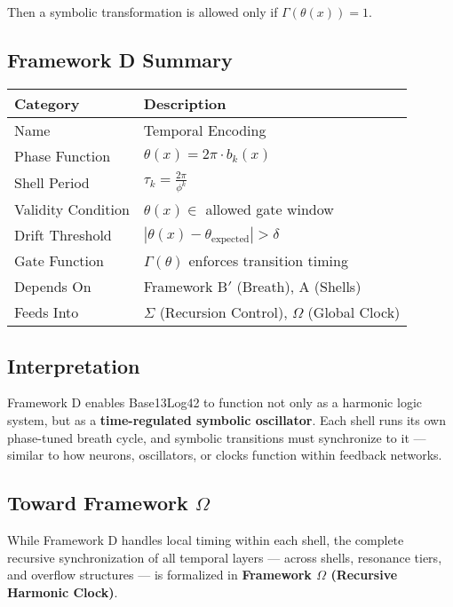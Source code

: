 Then a symbolic transformation is allowed only if $\Gamma(\theta(x)) = 1$.

\subsection*{Framework D Summary}

\begin{center}
\begin{tabular}{|l|l|}
\hline
\textbf{Category} & \textbf{Description} \\
\hline
Name & Temporal Encoding \\
Phase Function & $\theta(x) = 2\pi \cdot b_k(x)$ \\
Shell Period & $\tau_k = \frac{2\pi}{\phi^k}$ \\
Validity Condition & $\theta(x) \in$ allowed gate window \\
Drift Threshold & $|\theta(x) - \theta_{\text{expected}}| > \delta$ \\
Gate Function & $\Gamma(\theta)$ enforces transition timing \\
Depends On & Framework B$'$ (Breath), A (Shells) \\
Feeds Into & $\Sigma$ (Recursion Control), $\Omega$ (Global Clock) \\
\hline
\end{tabular}
\end{center}

\subsection*{Interpretation}

Framework D enables Base13Log42 to function not only as a harmonic logic system, but as a \textbf{time-regulated symbolic oscillator}. Each shell runs its own phase-tuned breath cycle, and symbolic transitions must synchronize to it — similar to how neurons, oscillators, or clocks function within feedback networks.

\subsection*{Toward Framework $\Omega$}

While Framework D handles local timing within each shell, the complete recursive synchronization of all temporal layers — across shells, resonance tiers, and overflow structures — is formalized in \textbf{Framework $\Omega$ (Recursive Harmonic Clock)}.
